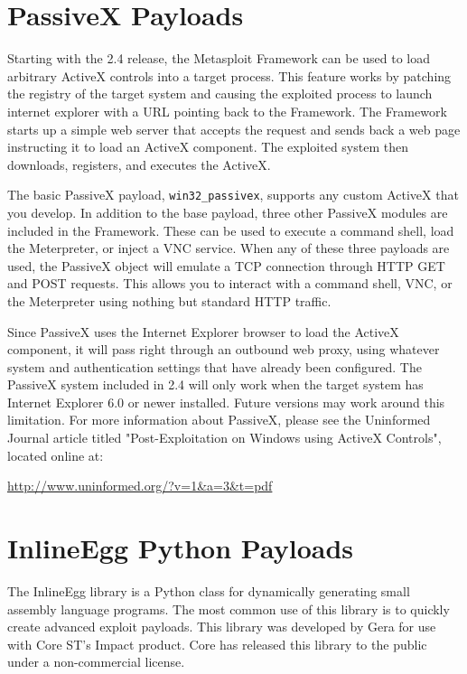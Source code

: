 \documentclass{report}
\begin{document}
\section{PassiveX Payloads}
\par
Starting with the 2.4 release, the Metasploit Framework can be used to load
arbitrary ActiveX controls into a target process. This feature works by patching
the registry of the target system and causing the exploited process to launch
internet explorer with a URL pointing back to the Framework. The Framework
starts up a simple web server that accepts the request and sends back a web page
instructing it to load an ActiveX component. The exploited system then downloads,
registers, and executes the ActiveX. 

\par
The basic PassiveX payload, \texttt{win32\_passivex}, supports any custom
ActiveX that you develop. In addition to the base payload, three other PassiveX
modules are included in the Framework. These can be used to execute a command
shell, load the Meterpreter, or inject a VNC service. When any of these three
payloads are used, the PassiveX object will emulate a TCP connection through
HTTP GET and POST requests. This allows you to interact with a command shell,
VNC, or the Meterpreter using nothing but standard HTTP traffic.

\par
Since PassiveX uses the Internet Explorer browser to load the ActiveX component,
it will pass right through an outbound web proxy, using whatever system and
authentication settings that have already been configured. The PassiveX system
included in 2.4 will only work when the target system has Internet Explorer 6.0
or newer installed. Future versions may work around this limitation. For more
information about PassiveX, please see the Uninformed Journal article titled
"Post-Exploitation on Windows using ActiveX Controls", located online at:

\url{http://www.uninformed.org/?v=1&a=3&t=pdf}


\section{InlineEgg Python Payloads}
\par
The InlineEgg library is a Python class for dynamically generating small
assembly language programs. The most common use of this library is to quickly
create advanced exploit payloads. This library was developed by Gera for use
with Core ST's Impact product. Core has released this library to the public
under a non-commercial license. 
\end{document}
